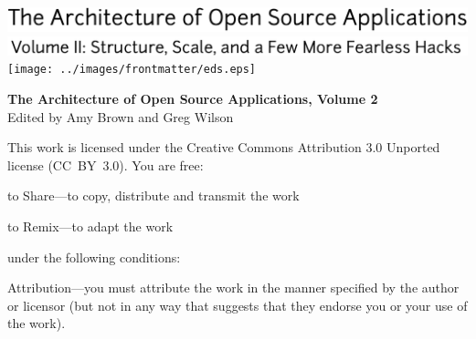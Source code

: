 \newpage

\thispagestyle{empty}
\mbox{}    %

\newpage

\thispagestyle{empty}
\vspace*{8.5cm}
\hspace{-2.3cm}
\includegraphics[width=475pt]{../images/frontmatter/title.pdf}
\\
\vspace{-1.1cm}
\hspace{-2.0cm}
\includegraphics[width=400pt]{../images/frontmatter/subtitle.pdf}
\vfill
\hspace{5.5cm}
\texttt{[image: ../images/frontmatter/eds.eps]}

\newpage

\thispagestyle{empty}

\small
\noindent \textbf{The Architecture of Open Source Applications, Volume 2} \\
Edited by Amy Brown and Greg Wilson

\vspace{0.15cm}

\noindent
This work is licensed under the Creative Commons Attribution 3.0
Unported license (CC~BY~3.0).  You are free:

\begin{aosaitemize}
  \item to Share---to copy, distribute and transmit the work
  \item to Remix---to adapt the work
\end{aosaitemize}

\noindent
under the following conditions:

\begin{aosaitemize}
  \item Attribution---you must attribute the work in the manner
    specified by the author or licensor (but not in any way that
    suggests that they endorse you or your use of the work).
\end{aosaitemize}

